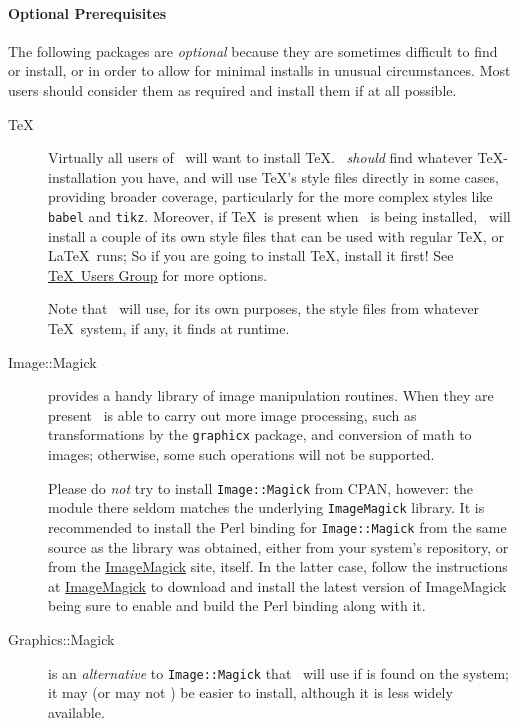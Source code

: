 \documentclass{article}
\begin{document}
\paragraph{Optional Prerequisites}
The following packages are \emph{optional} because they are sometimes difficult
to find or install, or in order to allow for minimal installs in unusual
circumstances.  Most users should consider them as required and install
them if at all possible.
\begin{description}
\item[\TeX] Virtually all users of \LaTeXML\ will want to install \TeX.  \LaTeXML\ 
\emph{should} find whatever \TeX-installation you have, and will
use \TeX's style files directly in some cases, providing broader coverage,
particularly for the more complex styles like \texttt{babel} and \texttt{tikz}.
Moreover, if \TeX\ is present when \LaTeXML\ is being installed,
\LaTeXML\ will install a couple of its own style files that can be used
with regular \TeX, or \LaTeX\ runs;
So if you are going to install \TeX, install it first!
See \href{https://www.tug.org}{\TeX\ Users Group} for more options.

Note that \LaTeXML\ will use, for its own purposes, the style files from whatever
\TeX\ system, if any, it finds at runtime.

\item[Image::Magick] provides a handy library of image manipulation routines.
When they are present \LaTeXML\ is able to carry out more image processing,
such as transformations by the \texttt{graphicx} package, and conversion of math to images;
otherwise, some such operations will not be supported.

Please do \emph{not} try to install \texttt{Image::Magick} from CPAN, however:
the module there seldom matches the underlying \texttt{ImageMagick} library.
It is recommended to install the Perl binding for \texttt{Image::Magick} from
the same source as the library was obtained, either from your system's repository,
or from the \href{http://www.imagemagick.org/}{ImageMagick} site, itself.
In the latter case, follow the instructions at \href{http://www.imagemagick.org/}{ImageMagick}
to download and install the latest version of ImageMagick being sure to enable
and build the Perl binding along with it.

\item[Graphics::Magick] is an \emph{alternative} to \texttt{Image::Magick} that \LaTeXML\ will
use if is found on the system; it may (or may not ) be easier to install, although it
is less widely available.


\end{description}
\end{document}
